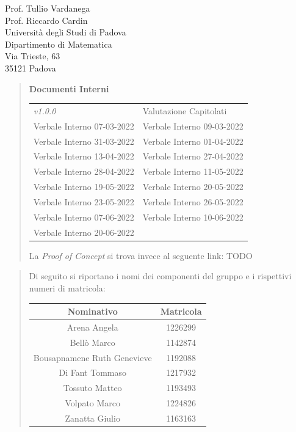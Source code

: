\documentclass{articoletteracdp}
\begin{document}
\begin{letter}{
			Prof. Tullio Vardanega \\
			Prof. Riccardo Cardin \\
			Università degli Studi di Padova \\
			Dipartimento di Matematica \\
			Via Trieste, 63 \\
			35121 Padova
		}
\begin{quotation}
\begin{center}
				\vspace{0.5cm}
				\textbf{Documenti Interni}\\ \vspace{0.25cm}
				\begin{tabular}{L{4.2cm} | R{4.2cm}}
					\NdP{} \textit{v1.0.0} & Valutazione Capitolati \\
					Verbale Interno 07-03-2022 & Verbale Interno 09-03-2022 \\
					Verbale Interno 31-03-2022 & Verbale Interno 01-04-2022 \\					
					Verbale Interno 13-04-2022 & Verbale Interno 27-04-2022 \\
					Verbale Interno 28-04-2022 & Verbale Interno 11-05-2022 \\
					Verbale Interno 19-05-2022 & Verbale Interno 20-05-2022 \\
					Verbale Interno 23-05-2022 & Verbale Interno 26-05-2022 \\
					Verbale Interno 07-06-2022 & Verbale Interno 10-06-2022 \\
					Verbale Interno 20-06-2022 & \\
 					
				\end{tabular}
			\end{center}
            
			La \textit{Proof of Concept} si trova invece al seguente link: TODO
        \end{quotation}

        \begin{quotation}
			\noindent
			Di seguito si riportano i nomi dei componenti del gruppo e i rispettivi numeri di matricola:

				\begin{center}
					\setlength{\extrarowheight}{.75ex}
					\begin{tabular}{ c | c }
						\textbf{Nominativo}           & \textbf{Matricola} \\
						\hline

						Arena Angela{}                & 1226299{}          \\
						Bellò Marco{}                 & 1142874{}          \\
						Bousapnamene Ruth Genevieve{} & 1192088{}          \\
						Di Fant Tommaso{}             & 1217932{}          \\
						Tossuto Matteo{}              & 1193493{}          \\
						Volpato Marco{}               & 1224826{}          \\
						Zanatta Giulio{}              & 1163163{}          \\


\end{tabular}
\end{center}
\end{quotation}
\end{letter}
\end{document}
